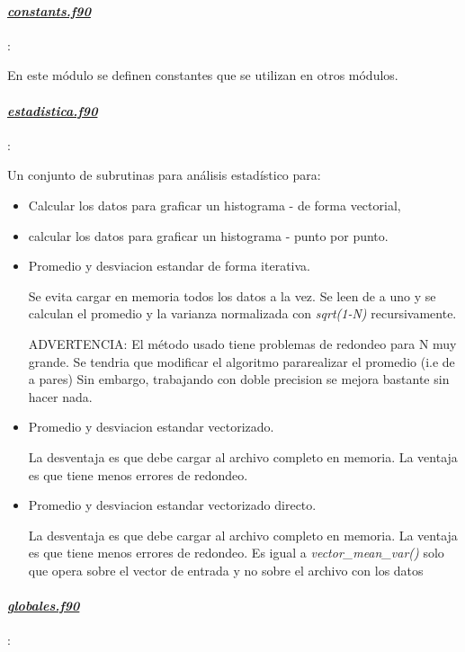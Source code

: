 \paragraph{\underline{\textit{constants.f90}}}:

 En este módulo se definen constantes que se utilizan en otros módulos. 

\paragraph{\underline{\textit{estadistica.f90}}}:

Un conjunto de subrutinas para análisis estad\'istico para:
\begin{itemize}
	\item{Calcular los datos para graficar un histograma - de forma vectorial},  
	\item{calcular los datos para graficar un histograma - punto por punto}.

	\item{Promedio y desviacion estandar de forma iterativa.}

 Se evita cargar en memoria todos los datos a la vez. Se leen de a uno y se 
 calculan el promedio y la varianza normalizada con \textit{sqrt(1-N)} recursivamente. 

 ADVERTENCIA: El método usado tiene problemas de redondeo para N muy grande.
 Se tendria que modificar el algoritmo pararealizar el promedio (i.e de a pares)
 Sin embargo, trabajando con doble precision se mejora bastante sin hacer nada.


 \item{Promedio y desviacion estandar vectorizado.}

 La desventaja es que debe cargar al archivo completo en memoria. La ventaja es
 que tiene menos errores de redondeo.


 \item{Promedio y desviacion estandar vectorizado directo.}

 La desventaja es que debe cargar al archivo completo en memoria. La ventaja es
 que tiene menos errores de redondeo.
 Es igual a \textit{vector\_mean\_var()} solo que opera sobre el vector de entrada
 y no sobre el archivo con los datos

\end{itemize}


\paragraph{\underline{\textit{globales.f90}}}:

